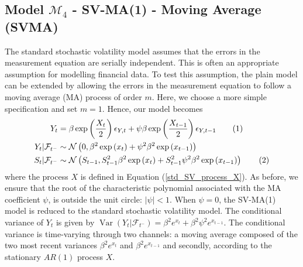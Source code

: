 \documentclass[11pt,a4,twosided,singlespacing,titlepagenumber=on]{scrreprt}
\numberwithin{equation}{chapter} %
\theoremstyle{remark}
\DeclareMathOperator{\var}{Var}
\newcommand\numberthis{\addtocounter{equation}{1}\tag{\theequation}}
\begin{document}
\subsection{Model $\mathcal{M}_4$ - SV-MA(1) - Moving Average (SVMA)}
The standard stochastic volatility model assumes that the errors in the measurement equation are serially independent. This is often an appropriate assumption for modelling financial data. To test this assumption, the plain model can be extended by allowing the errors in the measurement equation to follow a moving average (MA) process of order $m$. Here, we choose a more simple specification and set $m = 1$. Hence, our model becomes
\begin{align*}
Y_t									      &= \beta \exp \left( \frac{X_t}{2} \right) \epsilon_{Y,t} + \psi \beta \exp \left( \frac{X_{t-1}}{2} \right) \epsilon_{Y,t-1} \numberthis \\
Y_t	| \mathcal{F}_{t^-}		&\sim \mathcal{N} \left(0, \beta^2 \exp \left( x_t \right) + \psi^2 \beta^2 \exp \left( x_{t-1} \right) \right) \\
S_t | \mathcal{F}_{t^-}	  &\sim \mathcal{N} \left(S_{t-1}, S_{t-1}^2 \beta^2 \exp \left( x_t \right) +  S_{t-1}^2 \psi^2 \beta^2 \exp \left( x_{t-1} \right) \right) \numberthis
\end{align*}
where the process $X$ is defined in Equation (\ref{std_SV_process_X}). As before, we ensure that the root of the characteristic polynomial associated with the MA coefficient $\psi$, is outside the unit circle: $|\psi| < 1$. When $\psi = 0$, the SV-MA(1) model is reduced to the standard stochastic volatility model. The conditional
variance of $Y_t$ is given by $\var \left(Y_t | \mathcal{F}_{t^-} \right) = \beta^2 e^{x_t} + \beta^2 \psi^2 e^{x_{t-1}}$. The conditional variance is time-varying through two channels: a moving average composed of the two most recent variances $\beta^2 e^{x_t}$ and $\beta^2 e^{x_{t-1}}$ and secondly, according to the stationary $AR(1)$ process $X$.
\end{document}

